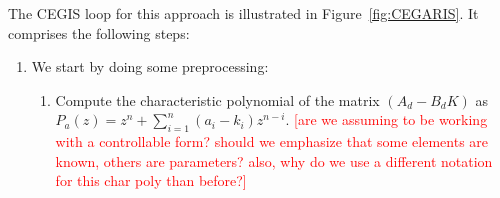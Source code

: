 \documentclass[twocolumn]{autart}    %
\newcommand{\mat}[1]{{#1}}
\renewcommand{\note}[1]{\textcolor{red}{[#1]}}
\begin{document}
The CEGIS loop for this approach is illustrated in Figure~\ref{fig:CEGARIS}. 
%
It comprises the following steps:  
\begin{enumerate}
\item 
  We start by doing some preprocessing:%
  \begin{enumerate}
\item Compute the characteristic polynomial of the matrix $(A_d-B_dK)$ as 
$P_a(z) = z^n+\sum_{i=1}^n{(a_i-k_i)z^{n-i}}$. 
\note{are we assuming to be working with a controllable form? should we emphasize that some elements are known, others are parameters? also, why do we use a different notation for this char poly than before?}   




\end{enumerate}
\end{enumerate}
\end{document}
